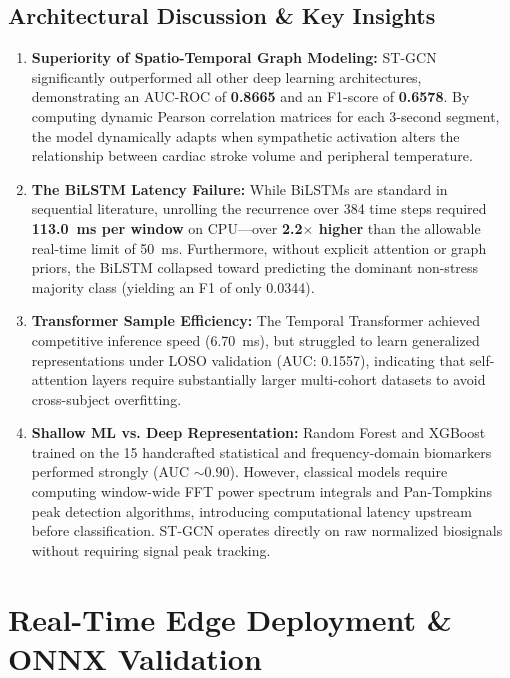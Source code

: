 \documentclass[conference]{IEEEtran}
\begin{document}
\subsection{Architectural Discussion \& Key Insights}
\begin{enumerate}
    \item \textbf{Superiority of Spatio-Temporal Graph Modeling:}
    ST-GCN significantly outperformed all other deep learning architectures, demonstrating an AUC-ROC of \textbf{0.8665} and an F1-score of \textbf{0.6578}. By computing dynamic Pearson correlation matrices for each 3-second segment, the model dynamically adapts when sympathetic activation alters the relationship between cardiac stroke volume and peripheral temperature.
    
    \item \textbf{The BiLSTM Latency Failure:}
    While BiLSTMs are standard in sequential literature, unrolling the recurrence over 384 time steps required \textbf{113.0~ms per window} on CPU---over \textbf{2.2$\times$ higher} than the allowable real-time limit of 50~ms. Furthermore, without explicit attention or graph priors, the BiLSTM collapsed toward predicting the dominant non-stress majority class (yielding an F1 of only 0.0344).

    \item \textbf{Transformer Sample Efficiency:}
    The Temporal Transformer achieved competitive inference speed (6.70~ms), but struggled to learn generalized representations under LOSO validation (AUC: 0.1557), indicating that self-attention layers require substantially larger multi-cohort datasets to avoid cross-subject overfitting.

    \item \textbf{Shallow ML vs. Deep Representation:}
    Random Forest and XGBoost trained on the 15 handcrafted statistical and frequency-domain biomarkers performed strongly (AUC $\sim 0.90$). However, classical models require computing window-wide FFT power spectrum integrals and Pan-Tompkins peak detection algorithms, introducing computational latency upstream before classification. ST-GCN operates directly on raw normalized biosignals without requiring signal peak tracking.
\end{enumerate}

\section{Real-Time Edge Deployment \& ONNX Validation}
\end{document}

